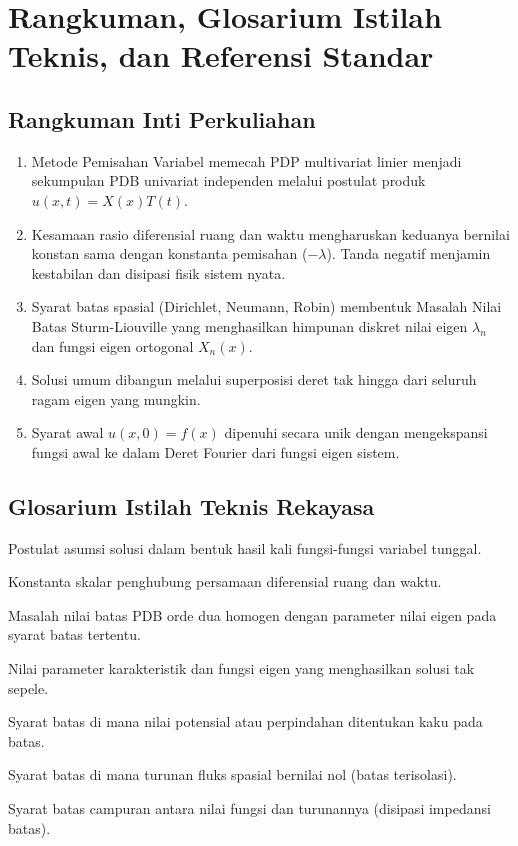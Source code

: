 \documentclass[11pt,a4paper]{article}
\theoremstyle{definition}
\begin{document}
\section{Rangkuman, Glosarium Istilah Teknis, dan Referensi Standar}

\subsection{Rangkuman Inti Perkuliahan}
\begin{enumerate}[leftmargin=*]
    \item Metode Pemisahan Variabel memecah PDP multivariat linier menjadi sekumpulan PDB univariat independen melalui postulat produk $u(x, t) = X(x) T(t)$.
    \item Kesamaan rasio diferensial ruang dan waktu mengharuskan keduanya bernilai konstan sama dengan konstanta pemisahan ($-\lambda$). Tanda negatif menjamin kestabilan dan disipasi fisik sistem nyata.
    \item Syarat batas spasial (Dirichlet, Neumann, Robin) membentuk Masalah Nilai Batas Sturm-Liouville yang menghasilkan himpunan diskret nilai eigen $\lambda_n$ dan fungsi eigen ortogonal $X_n(x)$.
    \item Solusi umum dibangun melalui superposisi deret tak hingga dari seluruh ragam eigen yang mungkin.
    \item Syarat awal $u(x, 0) = f(x)$ dipenuhi secara unik dengan mengekspansi fungsi awal ke dalam Deret Fourier dari fungsi eigen sistem.
\end{enumerate}

\subsection{Glosarium Istilah Teknis Rekayasa}
\begin{description}[leftmargin=!,labelwidth=3.5cm]
    \item[Product Ansatz] Postulat asumsi solusi dalam bentuk hasil kali fungsi-fungsi variabel tunggal.
    \item[Separation Constant] Konstanta skalar penghubung persamaan diferensial ruang dan waktu.
    \item[Sturm-Liouville Problem] Masalah nilai batas PDB orde dua homogen dengan parameter nilai eigen pada syarat batas tertentu.
    \item[Eigenvalue / Eigenfunction] Nilai parameter karakteristik dan fungsi eigen yang menghasilkan solusi tak sepele.
    \item[Dirichlet BC] Syarat batas di mana nilai potensial atau perpindahan ditentukan kaku pada batas.
    \item[Neumann BC] Syarat batas di mana turunan fluks spasial bernilai nol (batas terisolasi).
    \item[Robin BC] Syarat batas campuran antara nilai fungsi dan turunannya (disipasi impedansi batas).
\end{description}
\end{document}
